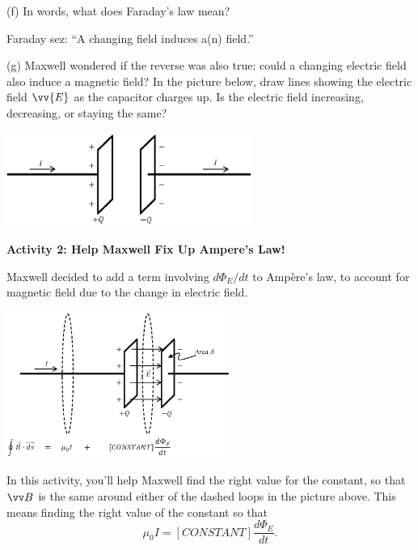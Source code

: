 (f) In words, what does Faraday's law mean?

\begin{center}
Faraday sez: ``A changing \underline{\hspace{1in}} field induces a(n) \underline{\hspace{1in}} field.''
\end{center}
   
(g) Maxwell wondered if the reverse was also true: could a changing electric field also induce a magnetic field?  In the picture below, draw lines showing the electric field $\vv{E}$ as the capacitor charges up.  Is the electric field  increasing, decreasing, or staying the same?
\begin{center}
\vspace{-0.2in}
    \includegraphics[width=0.6\textwidth]{deriving_em_waves/capacitor2.eps}
\end{center}

\pagebreak
\textbf{Activity 2: Help Maxwell Fix Up Ampere's Law!}

Maxwell decided to add a term involving $d\Phi_E/dt$ to Amp\`ere's law, to account for magnetic field due to the change in electric field.
\begin{center}
\vspace{-0.2in}
    \includegraphics[width=0.55\textwidth]{deriving_em_waves/two_loops_with_equation.eps}
\vspace{-0.1in}
\end{center}

In this activity, you'll help Maxwell find the right value for the constant, so that $\vv B$ is the same around either of the dashed loops in the picture above.  This means finding the right value of the constant so that
\begin{displaymath}
\mu_0I = [CONSTANT] \frac{d\Phi_E}{dt}.
\end{displaymath}

